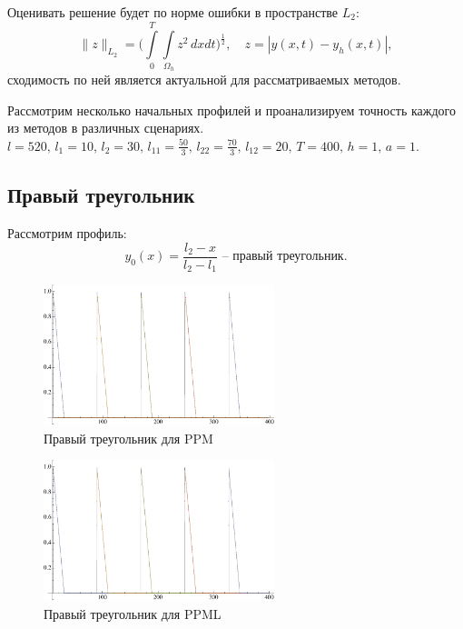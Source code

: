 \documentclass[12pt,a4paper]{article}
\begin{document}
    Оценивать решение будет по норме ошибки в пространстве $ L_2\colon $
    \[
        \|z\|_{L_2} = \Biggl( \int\limits_{0}^{T}\int\limits_{\Omega_h} z^2\, dx dt \Biggr)^{\tfrac{1}{2}}, \quad z = |y(x,t)-y_h(x,t)|,
    \]
    \noindent сходимость по ней является актуальной для рассматриваемых методов.

    Рассмотрим несколько начальных профилей и проанализируем точность каждого из методов в различных сценариях. $ l = 520,\, l_1 = 10,\, l_2 = 30,\, l_{11} = \frac{50}{3},\, l_{22} = \frac{70}{3},\, l_{12} = 20,\, T = 400,\, h = 1,\, a = 1$.

    \subsection{Правый треугольник}
    Рассмотрим профиль:
    \[
        y_0(x) = \dfrac{l_2 - x}{l_2 - l_1} \text{ -- правый треугольник}.
    \]
    
    \begin{figure}[h]
        \centering
        \includegraphics[width=0.6\textwidth]{c=1/h=1./advectionPPM_rightTriangle.pdf}
        \caption{Правый треугольник для PPM}
        \label{fig:ppm_rightTriangle}
    \end{figure}

    \begin{figure}[h]
        \centering
        \includegraphics[width=0.6\textwidth]{c=1/h=1./advectionPPML_rightTriangle.pdf}
        \caption{Правый треугольник для PPML}
        \label{fig:ppml_rightTriangle}
    \end{figure}
\end{document}
